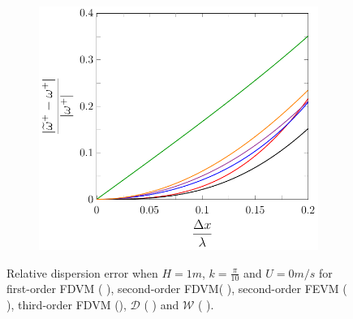 \begin{figure}
\begin{subfigure}{0.5\textwidth}
	\end{subfigure}
	\par\bigskip
	\begin{subfigure}{0.5\textwidth}
		\includegraphics[width=\textwidth]{./chp4/figures/New/Dispu0Shall.pdf}
	\end{subfigure}
	\caption{Relative dispersion error when $H = 1m$, $k = \frac{\pi}{10}$ and $U = 0 m/s$ for first-order FDVM ({\color{green!60!black} \solidrule}), second-order FDVM({\color{red} \solidrule}), second-order FEVM ({\color{blue} \solidrule}), third-order FDVM ({\solidrule}), $\mathcal{D}$ ({\color{violet!80!white} \solidrule}) and $\mathcal{W}$ ({\color{orange} \solidrule}).}
	\label{fig:Dispu0Shall}
\end{figure}

